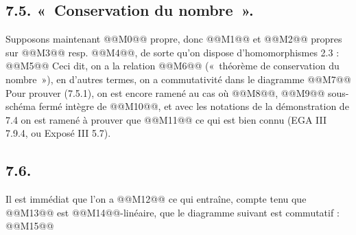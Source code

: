 
\subsection*{7.5. «~Conservation du nombre~».}
Supposons maintenant @@M0@@ propre, donc @@M1@@ et @@M2@@ propres sur @@M3@@ resp. @@M4@@, de sorte qu'on dispose d'homomorphismes 2.3 :
@@M5@@
Ceci dit, on a la relation
@@M6@@
(«~théorème de conservation du nombre~»), en d'autres termes, on a commutativité dans le diagramme
@@M7@@
Pour prouver (7.5.1), on est encore ramené au cas où @@M8@@, @@M9@@ sous-schéma fermé intègre de @@M10@@, et avec les notations de la démonstration de 7.4 on est ramené à prouver que
@@M11@@
ce qui est bien connu (EGA III 7.9.4, ou Exposé III 5.7).

\subsection*{7.6.}
Il est immédiat que l'on a
@@M12@@
ce qui entraîne, compte tenu que @@M13@@ est @@M14@@-linéaire, que le diagramme suivant est commutatif :
@@M15@@
